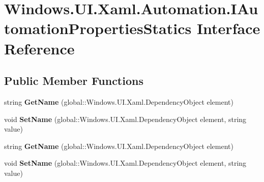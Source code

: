 \hypertarget{interface_windows_1_1_u_i_1_1_xaml_1_1_automation_1_1_i_automation_properties_statics}{}\section{Windows.\+U\+I.\+Xaml.\+Automation.\+I\+Automation\+Properties\+Statics Interface Reference}
\label{interface_windows_1_1_u_i_1_1_xaml_1_1_automation_1_1_i_automation_properties_statics}
\subsection*{Public Member Functions}
\begin{DoxyCompactItemize}
\item 
\mbox{\label{interface_windows_1_1_u_i_1_1_xaml_1_1_automation_1_1_i_automation_properties_statics_ace600cd5145b2141aa2691bffaa46ed0}} 
string {\bfseries Get\+Name} (global\+::\+Windows.\+U\+I.\+Xaml.\+Dependency\+Object element)
\item 
\mbox{\label{interface_windows_1_1_u_i_1_1_xaml_1_1_automation_1_1_i_automation_properties_statics_a690836151f64613c105b33e1b27517fd}} 
void {\bfseries Set\+Name} (global\+::\+Windows.\+U\+I.\+Xaml.\+Dependency\+Object element, string value)
\item 
\mbox{\label{interface_windows_1_1_u_i_1_1_xaml_1_1_automation_1_1_i_automation_properties_statics_ace600cd5145b2141aa2691bffaa46ed0}} 
string {\bfseries Get\+Name} (global\+::\+Windows.\+U\+I.\+Xaml.\+Dependency\+Object element)
\item 
\mbox{\label{interface_windows_1_1_u_i_1_1_xaml_1_1_automation_1_1_i_automation_properties_statics_a690836151f64613c105b33e1b27517fd}} 
void {\bfseries Set\+Name} (global\+::\+Windows.\+U\+I.\+Xaml.\+Dependency\+Object element, string value)
\item 
\mbox{\label{interface_windows_1_1_u_i_1_1_xaml_1_1_automation_1_1_i_automation_properties_statics_ace600cd5145b2141aa2691bffaa46ed0}} 

\end{DoxyCompactItemize}
